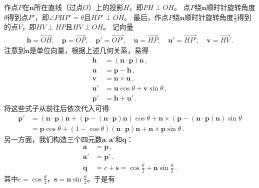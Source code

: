 作点$P$在$\bm n$所在直线（过点$O$）上的投影$H$，即$PH\perp OH$。
点$P$绕$\bm n$顺时针旋转角度$\theta$得到点$P'$，即$\angle PHP'=\theta$且$HP'\perp OH$。
最后，作点$P$绕$\bm n$顺时针旋转角度$\displaystyle\frac{\pi}{2}$得到的点$V$，即$HV\perp HP$且$HV\perp OH$。
记向量
\begin{align}
    \bm h=\overrightarrow{OH},\quad
    \bm p=\overrightarrow{OP},\quad
    \bm p'=\overrightarrow{OP'},\quad
    \bm u=\overrightarrow{HP},\quad
    \bm u'=\overrightarrow{HP'},\quad
    \bm v=\overrightarrow{HV}\, .
\end{align}
注意到$\bm n$是单位向量，根据上述几何关系，易得
\begin{align}
    \bm h  & =(\bm n\cdot\bm p)\bm n\, ,          \\
    \bm u  & =\bm p-\bm h\, ,                     \\
    \bm v  & =\bm n\times\bm u\, ,                \\
    \bm u' & =\bm u\cos\theta+\bm v\sin\theta\, , \\
    \bm p' & =\bm h+\bm u'\, .
\end{align}
将这些式子从前往后依次代入可得
\begin{align}
    \bm p' & =(\bm n\cdot\bm p)\bm n+(\bm p-(\bm n\cdot\bm p)\bm n)\cos\theta+\bm n\times(\bm p-(\bm n\cdot\bm p)\bm n)\sin\theta\nonumber \\
           & =\bm p\cos\theta+(1-\cos\theta)(\bm n\cdot\bm p)\bm n+\bm n\times\bm p\sin\theta\, .
\end{align}
另一方面，我们构造三个四元数$\bm a,\bm a'$和$\bm q$：
\begin{align}
    \bm a  & =\bm p\, ,                                                  \\
    \bm a' & =\bm p'\, ,                                                 \\
    \bm q  & =c+\bm s=\cos\frac{\theta}{2}+\bm n\sin\frac{\theta}{2}\, .
\end{align}
其中$\displaystyle c=\cos\frac{\theta}{2}$，$\displaystyle \bm s=\bm n\sin\frac{\theta}{2}$。于是有
